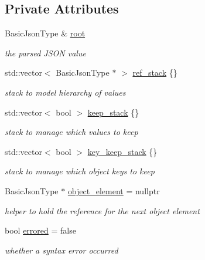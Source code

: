\subsection*{Private Attributes}
\begin{DoxyCompactItemize}
\item 
Basic\+Json\+Type \& \mbox{\hyperlink{classnlohmann_1_1detail_1_1json__sax__dom__callback__parser_a7b12037ca38be3ddec09c42bd71080cc}{root}}
\begin{DoxyCompactList}\small\item\em the parsed J\+S\+ON value \end{DoxyCompactList}\item 
std\+::vector$<$ Basic\+Json\+Type $\ast$ $>$ \mbox{\hyperlink{classnlohmann_1_1detail_1_1json__sax__dom__callback__parser_a82a0e49479660b9903597e1ef55c6601}{ref\+\_\+stack}} \{\}
\begin{DoxyCompactList}\small\item\em stack to model hierarchy of values \end{DoxyCompactList}\item 
std\+::vector$<$ bool $>$ \mbox{\hyperlink{classnlohmann_1_1detail_1_1json__sax__dom__callback__parser_ac24fd6c9f1b31b44328c16d65755ae76}{keep\+\_\+stack}} \{\}
\begin{DoxyCompactList}\small\item\em stack to manage which values to keep \end{DoxyCompactList}\item 
std\+::vector$<$ bool $>$ \mbox{\hyperlink{classnlohmann_1_1detail_1_1json__sax__dom__callback__parser_a8f0e96e8bc4f692169024105693f5706}{key\+\_\+keep\+\_\+stack}} \{\}
\begin{DoxyCompactList}\small\item\em stack to manage which object keys to keep \end{DoxyCompactList}\item 
Basic\+Json\+Type $\ast$ \mbox{\hyperlink{classnlohmann_1_1detail_1_1json__sax__dom__callback__parser_a2a8adecd936ba6ec187f1216241b508f}{object\+\_\+element}} = nullptr
\begin{DoxyCompactList}\small\item\em helper to hold the reference for the next object element \end{DoxyCompactList}\item 
bool \mbox{\hyperlink{classnlohmann_1_1detail_1_1json__sax__dom__callback__parser_ab06baaa640cfaae5846daa7c3594b116}{errored}} = false
\begin{DoxyCompactList}\small\item\em whether a syntax error occurred \end{DoxyCompactList}\item 

\end{DoxyCompactItemize}
